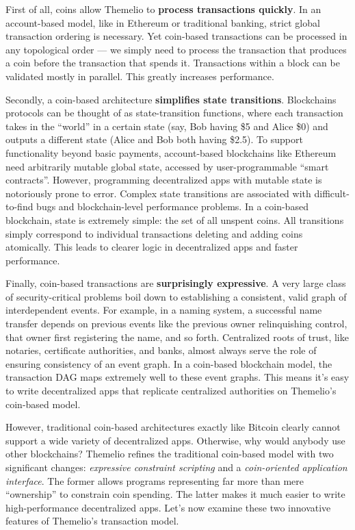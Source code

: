 \documentclass[headinclude]{scrbook}
\begin{document}
First of all, coins allow Themelio to \textbf{process transactions quickly}. In an account-based model, like in Ethereum or traditional banking, strict global transaction ordering is necessary. Yet coin-based transactions can be processed in any topological order --- we simply need to process the transaction that produces a coin before the transaction that spends it. Transactions within a block can be validated mostly in parallel. This greatly increases performance.

Secondly, a coin-based architecture \textbf{simplifies state transitions}. Blockchains protocols can be thought of as state-transition functions, where each transaction takes in the ``world'' in a certain state (say, Bob having \$5 and Alice \$0) and outputs a different state (Alice and Bob both having \$2.5). To support functionality beyond basic payments, account-based blockchains like Ethereum need arbitrarily mutable global state, accessed by user-programmable ``smart contracts''. However, programming decentralized apps with mutable state is notoriously prone to error. Complex state transitions are associated with difficult-to-find bugs and blockchain-level performance problems. In a coin-based blockchain, state is extremely simple: the set of all unspent coins. All transitions simply correspond to individual transactions deleting and adding coins atomically. This leads to clearer logic in decentralized apps and faster performance.

Finally, coin-based transactions are \textbf{surprisingly expressive}. A very large class of security-critical problems boil down to establishing a consistent, valid graph of interdependent events. For example, in a naming system, a successful name transfer depends on previous events like the previous owner relinquishing control, that owner first registering the name, and so forth. Centralized roots of trust, like notaries, certificate authorities, and banks, almost always serve the role of ensuring consistency of an event graph. In a coin-based blockchain model, the transaction DAG maps extremely well to these event graphs. This means it's easy to write decentralized apps that replicate centralized authorities on Themelio's coin-based model.

However, traditional coin-based architectures exactly like Bitcoin clearly cannot support a wide variety of decentralized apps. Otherwise, why would anybody use other blockchains? Themelio refines the traditional coin-based model with two significant changes: \emph{expressive constraint scripting} and a \textit{coin-oriented application interface}. The former allows programs representing far more than mere ``ownership'' to constrain coin spending. The latter makes it much easier to write high-performance decentralized apps. Let's now examine these two innovative features of Themelio's transaction model.
\end{document}
